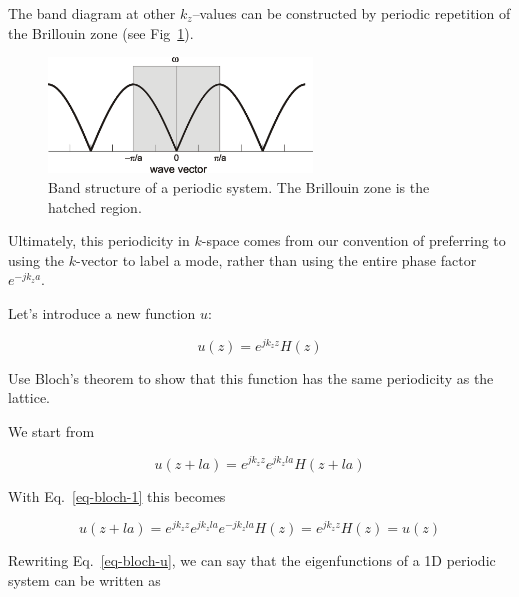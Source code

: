 The band diagram at other $k_z$--values can be constructed by periodic repetition of the Brillouin zone (see Fig~\ref{fig-band-folding}).

\begin{figure}[H]
\centering
\includegraphics[width=7cm]{symmetry/figures/band_folding}
\caption{Band structure of a periodic system. The Brillouin zone is the hatched region.}
\label{fig-band-folding}
\end{figure}

Ultimately, this periodicity in $k$-space comes from our convention of preferring to using the $k$-vector to label a mode, rather than using the entire phase factor $ e^{-j k_z a}$. 

\pagebreak

\label{week9}

Let's introduce a new function $u$:

\begin{equation}
u(z) = e^{j k_z z} H(z) \label{eq-bloch-u}
\end{equation} 

\begin{cue}
Use Bloch's theorem to show that this function has the same periodicity as the lattice.
\end{cue}

\noindent{}We start from

\begin{equation}
u(z+la)= e^{j k_z z} e^{j k_z l a} H(z + l a)
\end{equation} 

With Eq.~\ref{eq-bloch-1} this becomes

\begin{equation}
u(z+l a)= e^{j k_z z} e^{j k_z l a} e^{-j k_z l a} H(z) = e^{j k_z z} H(z) = u(z)
\end{equation} 

Rewriting Eq.~\ref{eq-bloch-u}, we can say that the eigenfunctions of a 1D periodic system can be written as

